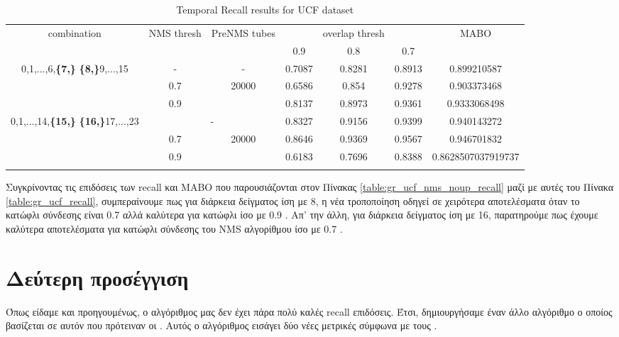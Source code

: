 \begin{center}
  \en
  \setlength{\tabcolsep}{2.2pt}
\begin{longtable}{||c | c | c | c c c| c|}

  \hline
  \multirow{2}{*}{combination} & \multirow{2}{2.5em}{NMS thresh} & \multirow{2}{3.5em}{PreNMS tubes} &  {} &overlap thresh & {} & \multirow{2}{*}{MABO} \\
  {} & {} & {} &  0.9 &  0.8 & 0.7 & {}\\         
  \hline

  \multirow{3}{7em}{0,1,...,6,\textbf{\{7,\}}
    \textbf{\{8,\}}9,...,15 }  &   -   & -    & 0.7087 & 0.8281 & 0.8913 & 0.899210587 \\
  \cline{2-7} 
  {} & 0.7 &\multirow{2}{*}{20000}  & 0.6586 & 0.854 & 0.9278 & 0.903373468 \\
  \cline{2-2} \cline{4-7} 
  {} &  0.9   & {}   &  0.8137 & 0.8973 & 0.9361 & 0.9333068498 \\
  \hline                                    
  \multirow{3}{7em}{0,1,...,14,\textbf{\{15,\}}
  \textbf{\{16,\}}17,...,23 }  &   \multicolumn{2}{|c|}{-} & 0.8327 & 0.9156 &0.9399 & 0.940143272 \\
  \cline{2-7}
  {} & 0.7 & \multirow{2}{*}{20000}& 0.8646 & 0.9369 & 0.9567 & 0.946701832 \\
  \cline{2-2} \cline{4-7} 
  {} &  0.9   & {}   & 0.6183 & 0.7696 & 0.8388 & 0.8628507037919737 \\
  \hline                                    

  \caption{Temporal Recall results for UCF dataset}
  \label{table:gr_ucf_nms_noup_temp_recall}
\end{longtable} 
\end{center}

Συγκρίνοντας τις επιδόσεις των \en recall \gr και \en MABO \gr που παρουσιάζονται στον Πίνακας \ref{table:gr_ucf_nms_noup_recall} μαζί με
αυτές του Πίνακα \ref{table:gr_ucf_recall}, συμπεραίνουμε πως για διάρκεια δείγματος ίση με 8, η νέα τροποποίηση οδηγεί σε χειρότερα αποτελέσματα
όταν το κατώφλι σύνδεσης είναι 0.7 αλλά καλύτερα για κατώφλι ίσο με 0.9 . Απ' την άλλη, για διάρκεια δείγματος ίση με 16, παρατηρούμε πως
έχουμε καλύτερα αποτελέσματα για κατώφλι σύνδεσης του \en NMS \gr αλγορίθμου ίσο με 0.7 .


\section{Δεύτερη προσέγγιση}
Όπως είδαμε και προηγουμένως, ο αλγόριθμος μας δεν έχει πάρα πολύ καλές \en recall \gr επιδόσεις. Έτσι, δημιουργήσαμε έναν άλλο αλγόριθμο
ο οποίος βασίζεται σε αυτόν που πρότειναν οι \en \cite{DBLP:journals/corr/abs-1903-00304}\gr.
Αυτός ο αλγόριθμος εισάγει δύο νέες μετρικές σύμφωνα με τους \en \cite{DBLP:journals/corr/abs-1903-00304}\gr.


